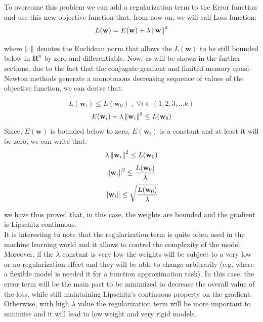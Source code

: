 \noindent To overcome this problem we can add a regularization term to the Error function and use this new objective function that, from now on, we will call Loss function:
\begin{equation}
    \label{eq:loss_f}
    L(\mathbf{w}) = E(\mathbf{w}) + \lambda\left\lVert\mathbf{w}\right\rVert^2
\end{equation}

where $\left\lVert\cdot\right\rVert$ denotes the Euclidean norm that allows the $L(\mathbf{w})$ to be still bounded below in $\mathbf{R}^n$  by zero and differentiable. Now, as will be shown in the further sections, due to the fact that the conjugate gradient and limited-memory quasi-Newton methods generate a monotonous decreasing sequence of values of the objective function, we can derive that:

$$L(\mathbf{w}_i) \leq L(\mathbf{w}_0)\; , \; \forall i \in (1,2,3, ...k)$$
$$E(\mathbf{w}_i) + \lambda \left\lVert\mathbf{w}_i\right\rVert^2 \leq L(\mathbf{w}_0)$$
Since, $E(\mathbf{w})$ is bounded below to zero,  $E(\mathbf{w}_i)$ is a constant and at least it will be zero, we can write that:
$$\lambda \left\lVert\mathbf{w}_i\right\rVert^2 \leq L(\mathbf{w}_0)$$
$$\left\lVert\mathbf{w}_i\right\rVert^2 \leq \frac{L(\mathbf{w}_0)}{\lambda} $$
$$\left\lVert\mathbf{w}_i\right\rVert \leq \sqrt{\frac{L(\mathbf{w}_0)}{\lambda}} $$

we have thus proved that, in this case, the weights are bounded and the gradient is Lipschitz continuous.\\

It is interesting to note that the regularization term is quite often used in the machine learning world and it allows to control the complexity of the model. Moreover, if the $\lambda$ constant is very low the weights will be subject to a very low or no regularization effect and they will be able to change arbitrarily (e.g. where a flexible model is needed it for a function approximation task). In this case, the error term will be the main part to be minimized to decrease the overall value of the loss, while still maintaining Lipschitz's continuous property on the gradient. Otherwise, with high $\lambda$ value the regularization term will be more important to minimise and it will lead to low weight and very rigid models.




